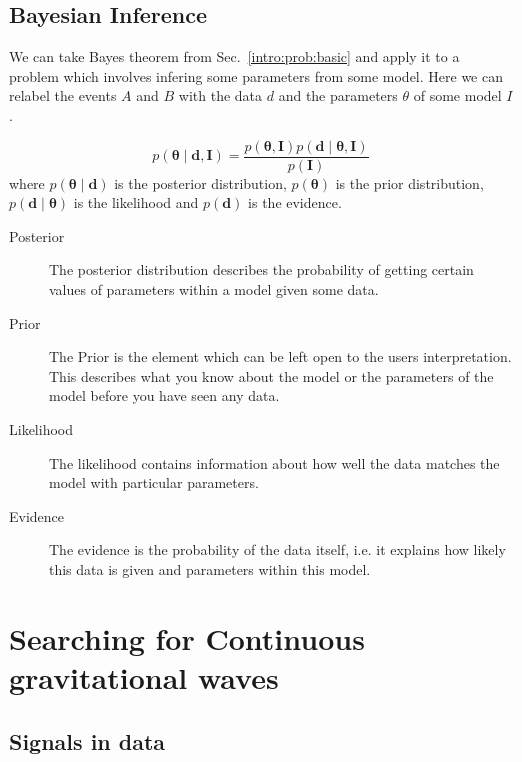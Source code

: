 \subsection{\label{intro:prob:bayes}Bayesian Inference}

We can take Bayes theorem from Sec.~\ref{intro:prob:basic} and apply it to a problem which involves infering some parameters from some model. Here we can relabel the events $A$ and $B$ with the data $d$ and the parameters $\theta$ of some model $I$.

\begin{equation}
p({\bm \theta} \mid {\bm d}, {\bm I}) = \frac{p({\bm \theta}, {\bm I})p({\bm d} \mid {\bm \theta}, {\bm I})}{p({\bm I})}
\end{equation}
where $p({\bm \theta} \mid {\bm d})$ is the posterior distribution, $p({\bm \theta})$ is the prior distribution,  $p({\bm d} \mid {\bm \theta})$ is the likelihood and $p({\bm d})$ is the evidence.

\begin{description}
\item [Posterior]
The posterior distribution describes the probability of getting certain values of parameters within a model given some data. 
\item [Prior]
The Prior is the element which can be left open to the users interpretation. This describes what you know about the model or the parameters of the model before you have seen any data. 
\item [Likelihood]
The likelihood contains information about how well the data matches the model with particular parameters. 
\item [Evidence]
The evidence is the probability of the data itself, i.e. it explains how likely this data is given and parameters within this model. 
\end{description}

\section{\label{intro:search}Searching for Continuous gravitational waves}

\subsection{\label{intro:search:signals} Signals in data}

